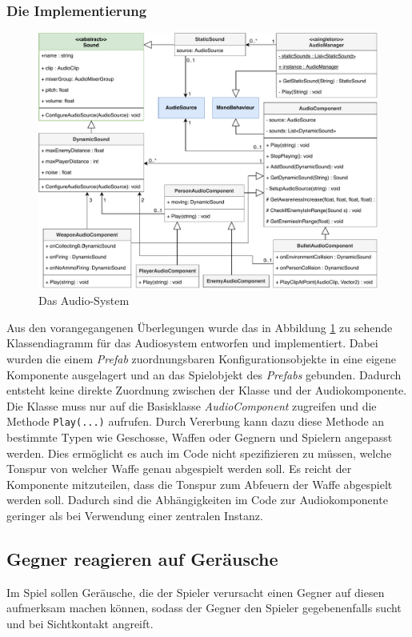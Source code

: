 {\subsubsection{Die Implementierung}
\begin {figure}[h]
	\begin {center}
	    \includegraphics[width=1\textwidth]{pics/audio_audiosystem.pdf}
		\caption{Das Audio-System}
		\label{fig:audio_system}
	\end {center}
\end {figure}
Aus den vorangegangenen Überlegungen wurde das in Abbildung \ref{fig:audio_system} zu sehende Klassendiagramm für das Audiosystem entworfen und implementiert. Dabei wurden die einem \textit{Prefab} zuordnungsbaren Konfigurationsobjekte in eine eigene Komponente ausgelagert und an das Spielobjekt des \textit{Prefabs} gebunden. Dadurch entsteht keine direkte Zuordnung zwischen der Klasse und der Audiokomponente. Die Klasse muss nur auf die Basisklasse \textit{AudioComponent} zugreifen und die Methode \texttt{Play(...)} aufrufen. Durch Vererbung kann dazu diese Methode an bestimmte Typen wie Geschosse, Waffen oder Gegnern und Spielern angepasst werden. Dies ermöglicht es auch im Code nicht spezifizieren zu müssen, welche Tonspur von welcher Waffe genau abgespielt werden soll. Es reicht der Komponente mitzuteilen, dass die Tonspur zum Abfeuern der Waffe abgespielt werden soll. Dadurch sind die Abhängigkeiten im Code zur Audiokomponente geringer als bei Verwendung einer zentralen Instanz.

\subsection{Gegner reagieren auf Geräusche} \label{sec:gegnerreaktionaufaudio}
Im Spiel sollen Geräusche, die der Spieler verursacht einen Gegner auf diesen aufmerksam machen können, sodass der Gegner den Spieler gegebenenfalls sucht und bei Sichtkontakt angreift. 

}
